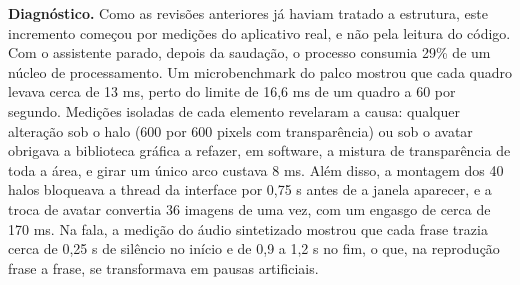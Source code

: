 \textbf{Diagnóstico.} Como as revisões anteriores já haviam tratado a estrutura, este incremento começou
por medições do aplicativo real, e não pela leitura do código. Com o assistente parado, depois da
saudação, o processo consumia 29\% de um núcleo de processamento. Um microbenchmark do palco mostrou que
cada quadro levava cerca de 13 ms, perto do limite de 16,6 ms de um quadro a 60 por segundo. Medições
isoladas de cada elemento revelaram a causa: qualquer alteração sob o halo (600 por 600 pixels com
transparência) ou sob o avatar obrigava a biblioteca gráfica a refazer, em software, a mistura de
transparência de toda a área, e girar um único arco custava 8 ms. Além disso, a montagem dos 40 halos
bloqueava a thread da interface por 0,75 s antes de a janela aparecer, e a troca de avatar convertia
36 imagens de uma vez, com um engasgo de cerca de 170 ms. Na fala, a medição do áudio sintetizado
mostrou que cada frase trazia cerca de 0,25 s de silêncio no início e de 0,9 a 1,2 s no fim, o que, na
reprodução frase a frase, se transformava em pausas artificiais.

